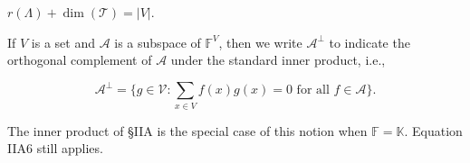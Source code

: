 $r(\Lambda) + \dim(\mathcal{T}) = |V|$.

If $V$ is a set and $\mathcal{A}$ is a subspace of $\mathbb{F}^V$, then we write $\mathcal{A}^\perp$ to indicate the orthogonal complement of $\mathcal{A}$ under the standard inner product, i.e.,

$$\mathcal{A}^\perp = \{g \in \mathcal{V} : \sum_{x \in V} f(x)g(x) = 0 \text{ for all } f \in \mathcal{A}\}.$$

The inner product of §IIA is the special case of this notion when $\mathbb{F} = \mathbb{K}$. Equation IIA6 still applies.

